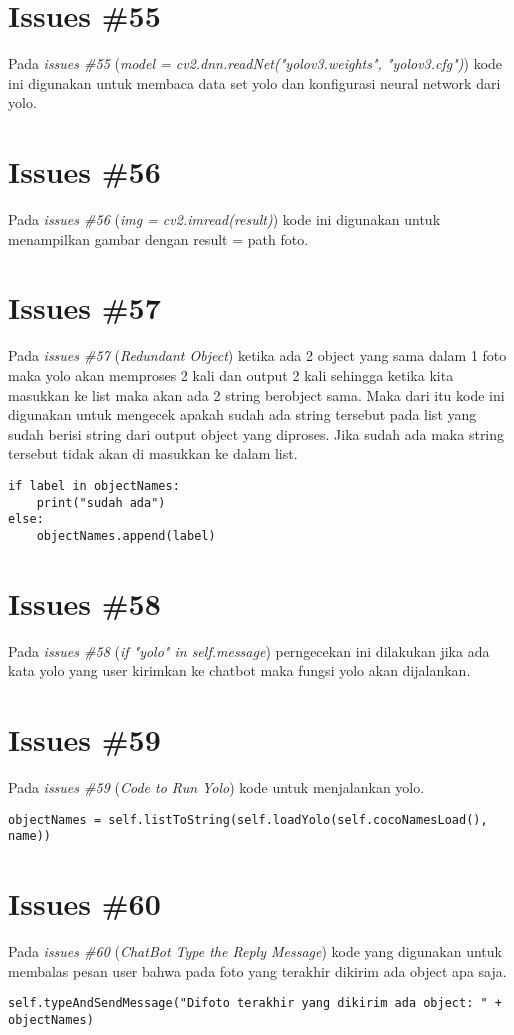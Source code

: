 \section{Issues \#55}
Pada \textit{issues \#55} (\textit{model = cv2.dnn.readNet("yolov3.weights", "yolov3.cfg")}) kode ini digunakan untuk membaca data set yolo dan konfigurasi neural network dari yolo.

\section{Issues \#56}
Pada \textit{issues \#56} (\textit{img = cv2.imread(result)}) kode ini digunakan untuk menampilkan gambar dengan result = path foto.

\section{Issues \#57}
Pada \textit{issues \#57} (\textit{Redundant Object}) ketika ada 2 object yang sama dalam 1 foto maka yolo akan memproses 2 kali dan output 2 kali sehingga ketika kita masukkan ke list maka akan ada 2 string berobject sama. Maka dari itu kode ini digunakan untuk mengecek apakah sudah ada string tersebut pada list yang sudah berisi string dari output object yang diproses. Jika sudah ada maka string tersebut tidak akan di masukkan ke dalam list.
\begin{verbatim}
if label in objectNames:
    print("sudah ada")
else:
    objectNames.append(label)
\end{verbatim}

\section{Issues \#58}
Pada \textit{issues \#58} (\textit{if "yolo" in self.message}) perngecekan ini dilakukan jika ada kata yolo yang user kirimkan ke chatbot maka fungsi yolo akan dijalankan.

\section{Issues \#59}
Pada \textit{issues \#59} (\textit{Code to Run Yolo}) kode untuk menjalankan yolo.
\begin{verbatim}
objectNames = self.listToString(self.loadYolo(self.cocoNamesLoad(), name))
\end{verbatim}

\section{Issues \#60}
Pada \textit{issues \#60} (\textit{ChatBot Type the Reply Message}) kode yang digunakan untuk membalas pesan user bahwa pada foto yang terakhir dikirim ada object apa saja.
\begin{verbatim}
self.typeAndSendMessage("Difoto terakhir yang dikirim ada object: " + objectNames)
\end{verbatim}